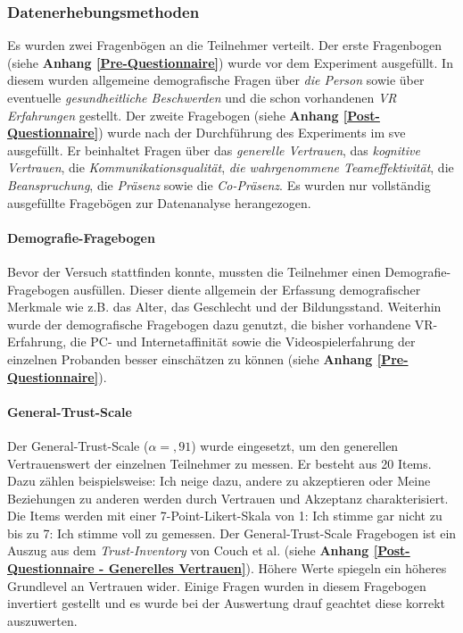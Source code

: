 \documentclass[a4paper,11pt]{article}%
\renewcommand{\\}{\vspace*{0.5\baselineskip} \newline}
\begin{document}
			\subsubsection{Datenerhebungsmethoden}
Es wurden zwei Fragenbögen an die Teilnehmer verteilt. Der erste Fragenbogen (siehe \textbf{Anhang \ref{Pre-Questionnaire}}) wurde vor dem Experiment ausgefüllt. In diesem wurden allgemeine demografische Fragen über \textit{die Person} sowie über eventuelle \textit{gesundheitliche Beschwerden} und die schon vorhandenen \textit{VR Erfahrungen} gestellt. Der zweite Fragebogen (siehe \textbf{Anhang \ref{Post-Questionnaire}}) wurde nach der Durchführung des Experiments im \ac{sve} ausgefüllt. Er beinhaltet Fragen über das \textit{generelle Vertrauen}, das \textit{kognitive Vertrauen}, die \textit{Kommunikationsqualität}, \textit{die wahrgenommene Teameffektivität}, die \textit{Beanspruchung}, die \textit{Präsenz} sowie die \textit{Co-Präsenz}. 
Es wurden nur vollständig ausgefüllte Fragebögen zur Datenanalyse herangezogen. \\
				
		\paragraph{Demografie-Fragebogen}
Bevor der Versuch stattfinden konnte, mussten die Teilnehmer einen Demografie-Fragebogen ausfüllen. Dieser diente allgemein der Erfassung demografischer Merkmale wie z.B. das Alter, das Geschlecht und der Bildungsstand. Weiterhin wurde der demografische Fragebogen dazu genutzt, die bisher vorhandene VR-Erfahrung, die PC- und Internetaffinität sowie die Videospielerfahrung der einzelnen Probanden besser einschätzen zu können (siehe \textbf{Anhang \ref{Pre-Questionnaire}}).

		\paragraph{General-Trust-Scale}
Der General-Trust-Scale ($\alpha =,91$) \citep{couch1996assessment} wurde eingesetzt, um den generellen Vertrauenswert der einzelnen Teilnehmer zu messen. Er besteht aus 20 Items. Dazu zählen beispielsweise: \glqq{}Ich neige dazu, andere zu akzeptieren\dq{} oder \glqq{}Meine Beziehungen zu anderen werden durch Vertrauen und Akzeptanz charakterisiert\dq{}. Die Items werden mit einer 7-Point-Likert-Skala von 1: \glqq{}Ich stimme gar nicht zu\dq{} bis zu 7: \glqq{}Ich stimme voll zu\dq{} gemessen. Der General-Trust-Scale Fragebogen ist ein Auszug aus dem \textit{Trust-Inventory} von Couch et al. (siehe \textbf{Anhang \ref{Post-Questionnaire - Generelles Vertrauen}}). Höhere Werte spiegeln ein höheres Grundlevel an Vertrauen wider. Einige Fragen wurden in diesem Fragebogen invertiert gestellt und es wurde bei der Auswertung drauf geachtet diese korrekt auszuwerten.
\end{document}
